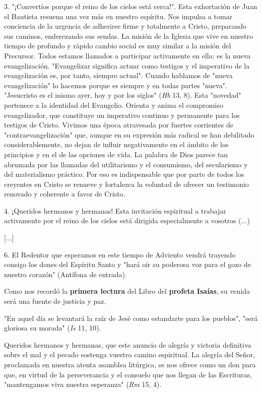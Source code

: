 \begin{body}
\begin{body}
3. "¡Convertíos porque el reino de los cielos está cerca!". Esta exhortación de Juan el Bautista resuena una vez más en nuestro espíritu. Nos impulsa a tomar conciencia de la urgencia de adherirse firme y totalmente a Cristo, preparando sus caminos, enderezando sus sendas. La misión de la Iglesia que vive en nuestro tiempo de profundo y rápido cambio social es muy similar a la misión del Precursor. Todos estamos llamados a participar activamente en ella: es la nueva evangelización. "Evangelizar significa actuar como testigos y el imperativo de la evangelización es, por tanto, siempre actual". Cuando hablamos de "nueva evangelización" lo hacemos porque es siempre y en todas partes "nueva". "Jesucristo es el mismo ayer, hoy y por los siglos" (\emph{Hb} 13, 8). Esta "novedad" pertenece a la identidad del Evangelio. Orienta y anima el compromiso evangelizador, que constituye un imperativo continuo y permanente para los testigos de Cristo. Vivimos una época atravesada por fuertes corrientes de "contraevangelización" que, aunque en su expresión más radical se han debilitado considerablemente, no dejan de influir negativamente en el ámbito de los principios y en el de las opciones de vida. La palabra de Dios parece tan abrumada por las llamadas del utilitarismo y el consumismo, del secularismo y del materialismo práctico. Por eso es indispensable que por parte de todos los creyentes en Cristo se renueve y fortalezca la voluntad de ofrecer un testimonio renovado y coherente a favor de Cristo.

4. ¡Queridos hermanos y hermanas! Esta invitación espiritual a trabajar activamente por el reino de los cielos está dirigida especialmente a vosotros (...)

{[}...{]}

6. El Redentor que esperamos en este tiempo de Adviento vendrá trayendo consigo los dones del Espíritu Santo y "hará oír su poderosa voz para el gozo de nuestro corazón" (Antífona de entrada).

Como nos recordó la \textbf{primera lectura} del Libro del \textbf{profeta Isaías}, su venida será una fuente de justicia y paz.

"En aquel día se levantará la raíz de Jesé como estandarte para los pueblos", "será gloriosa su morada" (\emph{Is} 11, 10).

Queridos hermanos y hermanas, que este anuncio de alegría y victoria definitiva sobre el mal y el pecado sostenga vuestro camino espiritual. La alegría del Señor, proclamada en nuestra atenta asamblea litúrgica, se nos ofrece como un don para que, en virtud de la perseverancia y el consuelo que nos llegan de las Escrituras, "mantengamos viva nuestra esperanza" (\emph{Rm} 15, 4).


\end{body}
\end{body}
